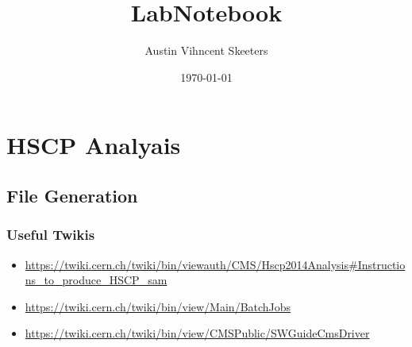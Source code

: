\documentclass[11 pt , letterpaper , twoside , openright]{book}
\author{Austin Vihncent Skeeters}
\date{\today}
\title{LabNotebook}
\begin{document}
\maketitle
\tableofcontents


\part{HSCP Analyais}
\label{sec-1}
\chapter{File Generation}
\label{sec-1-1}
\section{Useful Twikis}
\label{sec-1-1-1}
\begin{itemize}
\item \url{https://twiki.cern.ch/twiki/bin/viewauth/CMS/Hscp2014Analysis#Instructions_to_produce_HSCP_sam}
\item \url{https://twiki.cern.ch/twiki/bin/view/Main/BatchJobs}
\item \url{https://twiki.cern.ch/twiki/bin/view/CMSPublic/SWGuideCmsDriver}
\end{itemize}
\end{document}
